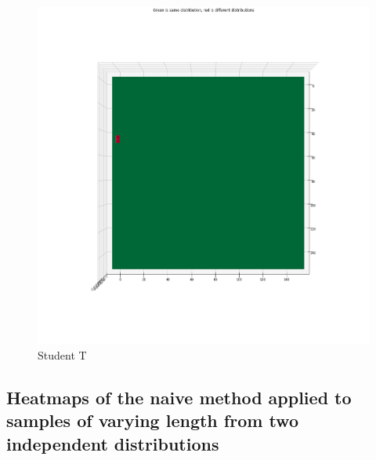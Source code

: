 \clearpage
\begin{figure}[htb]
  \centering
  \includegraphics[width=\linewidth]{./img/hypothesis_test/appendix/naive_student_t.png}
  \caption{Student T}
\end{figure}
\clearpage
\subsection{Heatmaps of the naive method applied to samples of varying length from two independent distributions}

